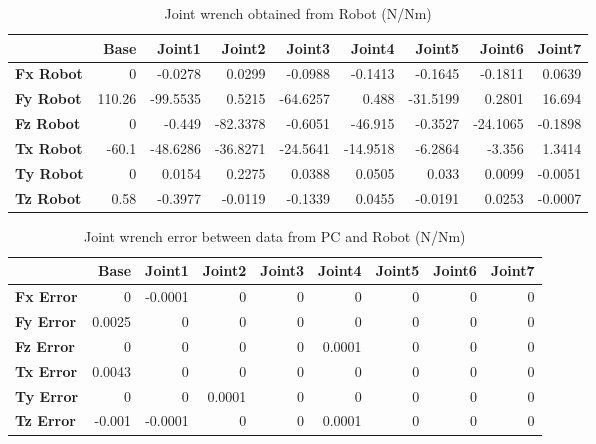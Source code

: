 \begin{table}[h!]
	\centering
	\caption{Joint wrench obtained from Robot (N/Nm)}
	\label{wrech_Robot_Pose11}
	\begin{tabular}{|l|r|r|r|r|r|r|r|r|}
		\hline
		\textbf{} & \textbf{Base} & \textbf{Joint1}  & \textbf{Joint2}  & \textbf{Joint3}  & \textbf{Joint4}  & \textbf{Joint5}  & \textbf{Joint6}  & \textbf{Joint7} \\ \hline
		\textbf{Fx Robot}  & 0        & -0.0278        & 0.0299        & -0.0988        & -0.1413        & -0.1645        & -0.1811        & 0.0639 \\ \hline
		\textbf{Fy Robot}  & 110.26        & -99.5535        & 0.5215        & -64.6257        & 0.488        & -31.5199        & 0.2801        & 16.694 \\ \hline
		\textbf{Fz Robot}  & 0        & -0.449        & -82.3378        & -0.6051        & -46.915        & -0.3527        & -24.1065        & -0.1898 \\ \hline
		\textbf{Tx Robot}  & -60.1        & -48.6286        & -36.8271        & -24.5641        & -14.9518        & -6.2864        & -3.356        & 1.3414 \\ \hline
		\textbf{Ty Robot}  & 0        & 0.0154        & 0.2275        & 0.0388        & 0.0505        & 0.033        & 0.0099        & -0.0051 \\ \hline
		\textbf{Tz Robot}  & 0.58        & -0.3977        & -0.0119        & -0.1339        & 0.0455        & -0.0191        & 0.0253        & -0.0007 \\ \hline
	\end{tabular}
\end{table}

\begin{table}[h!]
	\centering
	\caption{Joint wrench error between data from PC and Robot (N/Nm)}
	\label{wrech_Error_Pose11}
	\begin{tabular}{|l|r|r|r|r|r|r|r|r|}
		\hline
		\textbf{}  & \textbf{Base} & \textbf{Joint1}  & \textbf{Joint2}  & \textbf{Joint3}  & \textbf{Joint4}  & \textbf{Joint5}  & \textbf{Joint6}  & \textbf{Joint7} \\ \hline
		\textbf{Fx Error}  & 0        & -0.0001        & 0        & 0        & 0        & 0        & 0        & 0 \\ \hline
		\textbf{Fy Error}  & 0.0025        & 0        & 0        & 0        & 0        & 0        & 0        & 0 \\ \hline
		\textbf{Fz Error}  & 0        & 0        & 0        & 0        & 0.0001        & 0        & 0        & 0 \\ \hline
		\textbf{Tx Error}  & 0.0043        & 0        & 0        & 0        & 0        & 0        & 0        & 0 \\ \hline
		\textbf{Ty Error}  & 0        & 0        & 0.0001        & 0        & 0        & 0        & 0        & 0 \\ \hline
		\textbf{Tz Error}  & -0.001        & -0.0001        & 0        & 0        & 0.0001        & 0        & 0        & 0 \\ \hline
	\end{tabular}
\end{table}

